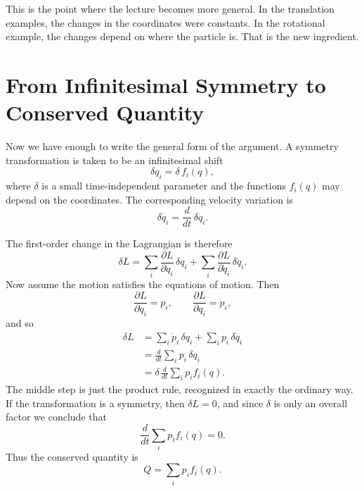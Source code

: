This is the point where the lecture becomes more general. In the translation examples, the changes in the coordinates were constants. In the rotational example, the changes depend on where the particle is. That is the new ingredient.

\section{From Infinitesimal Symmetry to Conserved Quantity}

Now we have enough to write the general form of the argument. A symmetry transformation is taken to be an infinitesimal shift
\begin{equation}
\delta q_i=\delta\,f_i(q),
\end{equation}
where \(\delta\) is a small time-independent parameter and the functions \(f_i(q)\) may depend on the coordinates. The corresponding velocity variation is
\begin{equation}
\delta\dot q_i=\frac{d}{dt}\,\delta q_i.
\end{equation}

The first-order change in the Lagrangian is therefore
\begin{equation}
\delta L
=
\sum_i \frac{\partial L}{\partial q_i}\,\delta q_i
+
\sum_i \frac{\partial L}{\partial \dot q_i}\,\delta\dot q_i.
\end{equation}
Now assume the motion satisfies the equations of motion. Then
\begin{equation}
\frac{\partial L}{\partial \dot q_i}=p_i,
\qquad
\frac{\partial L}{\partial q_i}=\dot p_i,
\end{equation}
and so
\begin{align}
\delta L
&=
\sum_i \dot p_i\,\delta q_i
+
\sum_i p_i\,\delta\dot q_i \\
&=
\frac{d}{dt}\sum_i p_i\,\delta q_i \\
&=
\delta\,\frac{d}{dt}\sum_i p_i f_i(q).
\end{align}
The middle step is just the product rule, recognized in exactly the ordinary way. If the transformation is a symmetry, then \(\delta L=0\), and since \(\delta\) is only an overall factor we conclude that
\begin{equation}
\frac{d}{dt}\sum_i p_i f_i(q)=0.
\end{equation}
Thus the conserved quantity is
\begin{equation}
Q=\sum_i p_i f_i(q).
\end{equation}

